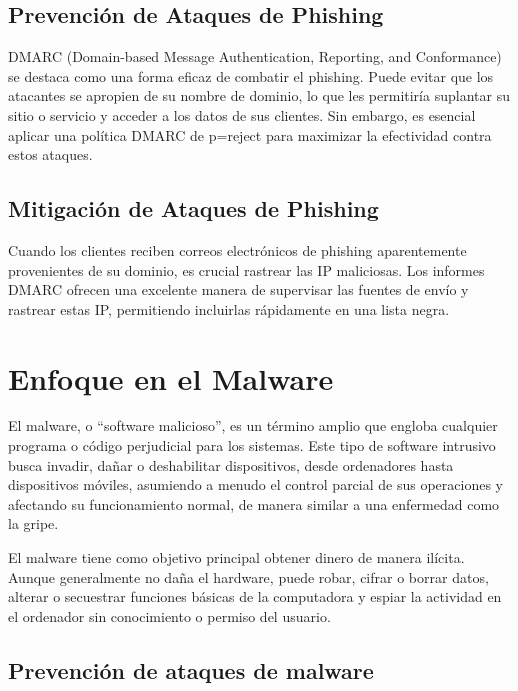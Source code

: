 \documentclass[letterpaper, 12pt]{article}
\begin{document}
\subsection{Prevención de Ataques de Phishing}

DMARC (Domain-based Message Authentication, Reporting, and
Conformance) se destaca como una forma eficaz de combatir
el phishing. Puede evitar que los atacantes se apropien de
su nombre de dominio, lo que les permitiría suplantar su
sitio o servicio y acceder a los datos de sus clientes. Sin
embargo, es esencial aplicar una política DMARC de p=reject
para maximizar la efectividad contra estos ataques.

\subsection{Mitigación de Ataques de Phishing}

Cuando los clientes reciben correos electrónicos de
phishing aparentemente provenientes de su dominio, es
crucial rastrear las IP maliciosas. Los informes DMARC
ofrecen una excelente manera de supervisar las fuentes de
envío y rastrear estas IP, permitiendo incluirlas
rápidamente en una lista negra.

\section{Enfoque en el Malware}

El malware, o ``software malicioso'', es un término amplio
que engloba cualquier programa o código perjudicial para
los sistemas. Este tipo de software intrusivo busca
invadir, dañar o deshabilitar dispositivos, desde
ordenadores hasta dispositivos móviles, asumiendo a menudo
el control parcial de sus operaciones y afectando su
funcionamiento normal, de manera similar a una enfermedad
como la gripe.

El malware tiene como objetivo principal obtener dinero de
manera ilícita. Aunque generalmente no daña el hardware,
puede robar, cifrar o borrar datos, alterar o secuestrar
funciones básicas de la computadora y espiar la actividad
en el ordenador sin conocimiento o permiso del usuario.

\subsection{Prevención de ataques de malware}
\end{document}

